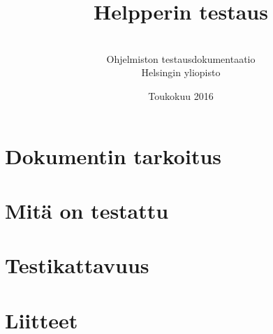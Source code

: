 \documentclass[a4paper,12pt, titlepage]{article}
\title{Helpperin testaus}
\author{ \\[1cm] Ohjelmiston testausdokumentaatio \\ Helsingin yliopisto}
\date{Toukokuu 2016}
\begin{document}
\maketitle

\tableofcontents

\section{Dokumentin tarkoitus}

\section{Mitä on testattu}

\section{Testikattavuus}

\section{Liitteet}
\end{document}
